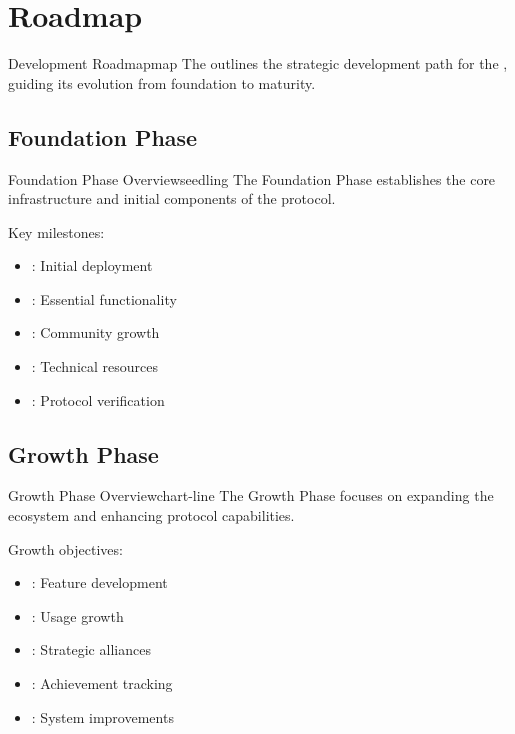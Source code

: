 
\section{Roadmap}

\begin{mfai-box}{Development Roadmap}{map}
The  outlines the strategic development path for the , guiding its evolution from foundation to maturity.
\end{mfai-box}

\subsection{Foundation Phase}

\begin{mfai-box-learn}{Foundation Phase Overview}{seedling}
The Foundation Phase establishes the core infrastructure and initial components of the protocol.
\end{mfai-box-learn}

Key milestones:

\begin{itemize}[leftmargin=*]
\item {}: Initial deployment
\item {}: Essential functionality
\item {}: Community growth
\item {}: Technical resources
\item {}: Protocol verification
\end{itemize}

\subsection{Growth Phase}

\begin{mfai-box-build}{Growth Phase Overview}{chart-line}
The Growth Phase focuses on expanding the ecosystem and enhancing protocol capabilities.
\end{mfai-box-build}

Growth objectives:

\begin{itemize}[leftmargin=*]
\item {}: Feature development
\item {}: Usage growth
\item {}: Strategic alliances
\item {}: Achievement tracking
\item {}: System improvements
\end{itemize}


